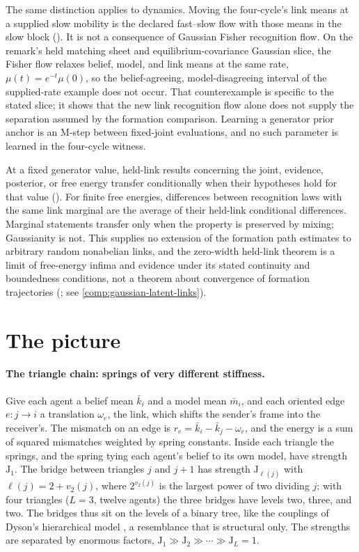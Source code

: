 The same distinction applies to dynamics. Moving the four-cycle's link means at a supplied slow
mobility is the declared fast--slow flow with those means in the slow block
(). It is not a consequence of Gaussian Fisher recognition flow. On the
remark's held matching sheet and equilibrium-covariance Gaussian slice, the Fisher flow relaxes
belief, model, and link means at the same rate, $\mu(t)=e^{-t}\mu(0)$, so the belief-agreeing,
model-disagreeing interval of the supplied-rate example does not occur. That counterexample is
specific to the stated slice; it shows that the new link recognition flow alone does not supply
the separation assumed by the formation comparison. Learning a generator prior anchor is an
M-step between fixed-joint evaluations, and no such parameter is learned in the four-cycle
witness.

At a fixed generator value, held-link results concerning the joint, evidence, posterior, or free
energy transfer conditionally when their hypotheses hold for that value
(). For finite free energies, differences between recognition
laws with the same link marginal are the average of their held-link conditional differences.
Marginal statements transfer only when the property is preserved by mixing; Gaussianity is not.
This supplies no extension of the formation path estimates to arbitrary random nonabelian links,
and the zero-width held-link theorem is a limit of free-energy infima and evidence under its stated
continuity and boundedness conditions, not a theorem about convergence of formation trajectories
(; see \cref{comp:gaussian-latent-links}).

\section{The picture}
\label{comp:ch13-picture}

\paragraph{The triangle chain: springs of very different stiffness.}
Give each agent a belief mean \(\bar k_i\) and a model mean \(\bar m_i\), and each oriented edge
\(e:j\to i\) a translation \(\omega_e\), the link, which shifts the sender's frame into the receiver's.
The mismatch on an edge is \(r_e=\bar k_i-\bar k_j-\omega_e\), and the energy is a sum of squared
mismatches weighted by spring constants. Inside each triangle the springs, and the spring tying each
agent's belief to its own model, have strength \(\mathrm J_1\). The bridge between triangles \(j\) and
\(j+1\) has strength \(\mathrm J_{\ell(j)}\) with \(\ell(j)=2+v_2(j)\), where \(2^{v_2(j)}\) is the largest
power of two dividing \(j\); with four triangles (\(L=3\), twelve agents) the three bridges have levels
two, three, and two. The bridges thus sit on the levels of a binary tree, like the couplings of Dyson's
hierarchical model \citep{Dyson1969}, a resemblance that is structural only. The strengths are
separated by enormous factors, \(\mathrm J_1\gg\mathrm J_2\gg\cdots\gg\mathrm J_L=1\).

